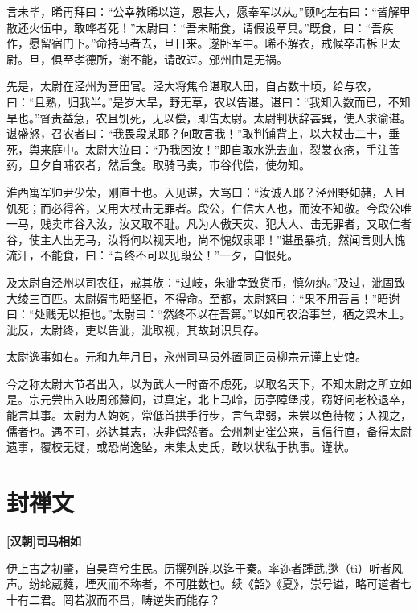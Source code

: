 \documentclass[UTF8,titlepage,oneside]{ctexbook}
\begin{document}
言未毕，晞再拜曰：“公幸教晞以道，恩甚大，愿奉军以从。”顾叱左右曰：“皆解甲散还火伍中，敢哗者死！”太尉曰：“吾未晡食，请假设草具。”既食，曰：“吾疾作，愿留宿门下。”命持马者去，旦日来。遂卧军中。晞不解衣，戒候卒击柝卫太尉。旦，俱至孝德所，谢不能，请改过。邠州由是无祸。

先是，太尉在泾州为营田官。泾大将焦令谌取人田，自占数十顷，给与农，曰：“且熟，归我半。”是岁大旱，野无草，农以告谌。谌曰：“我知入数而已，不知旱也。”督责益急，农且饥死，无以偿，即告太尉。太尉判状辞甚巽，使人求谕谌。谌盛怒，召农者曰：“我畏段某耶？何敢言我！”取判铺背上，以大杖击二十，垂死，舆来庭中。太尉大泣曰：“乃我困汝！”即自取水洗去血，裂裳衣疮，手注善药，旦夕自哺农者，然后食。取骑马卖，市谷代偿，使勿知。

淮西寓军帅尹少荣，刚直士也。入见谌，大骂曰：“汝诚人耶？泾州野如赭，人且饥死；而必得谷，又用大杖击无罪者。段公，仁信大人也，而汝不知敬。今段公唯一马，贱卖市谷入汝，汝又取不耻。凡为人傲天灾、犯大人、击无罪者，又取仁者谷，使主人出无马，汝将何以视天地，尚不愧奴隶耶！”谌虽暴抗，然闻言则大愧流汗，不能食，曰：“吾终不可以见段公！”一夕，自恨死。

及太尉自泾州以司农征，戒其族：“过岐，朱泚幸致货币，慎勿纳。”及过，泚固致大绫三百匹。太尉婿韦晤坚拒，不得命。至都，太尉怒曰：“果不用吾言！”晤谢曰：“处贱无以拒也。”太尉曰：“然终不以在吾第。”以如司农治事堂，栖之梁木上。泚反，太尉终，吏以告泚，泚取视，其故封识具存。

太尉逸事如右。元和九年月日，永州司马员外置同正员柳宗元谨上史馆。

今之称太尉大节者出入，以为武人一时奋不虑死，以取名天下，不知太尉之所立如是。宗元尝出入岐周邠斄间，过真定，北上马岭，历亭障堡戍，窃好问老校退卒，能言其事。太尉为人姁姁，常低首拱手行步，言气卑弱，未尝以色待物；人视之，儒者也。遇不可，必达其志，决非偶然者。会州刺史崔公来，言信行直，备得太尉遗事，覆校无疑，或恐尚逸坠，未集太史氏，敢以状私于执事。谨状。


\chapter*{封禅文}
\begin{center}
	\textbf{[汉朝]司马相如}
\end{center}

伊上古之初肇，自昊穹兮生民。历撰列辟,以迄于秦。率迩者踵武,逖（tì）听者风声。纷纶葳蕤，堙灭而不称者，不可胜数也。续《韶》《夏》，崇号谥，略可道者七十有二君。罔若淑而不昌，畴逆失而能存？
\end{document}
